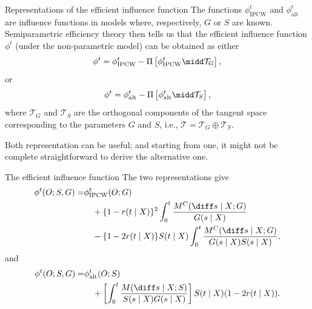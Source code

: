 \documentclass[handout]{beamer}\usepackage{listings}
\begin{document}
\begin{frame}[label={sec:org7dbfd63}]{Representations of the efficient influence function}
The functions $\phi^t_{\mathrm{IPCW}}$ and $\phi^t_{\mathrm{alt}}$ are influence functions in
models where, respectively, $G$ or $S$ are known. \pause Semiparametric efficiency theory then
tells us that the efficient influence function $\phi^t$ (under the non-parametric model) can be
obtained as either
\begin{equation*}
  \phi^t = 
  \phi^t_{\mathrm{IPCW}} - \Pi
  \left[
    \phi^t_{\mathrm{IPCW}} \midd \mathcal{T}_{G}
  \right],
\end{equation*}
or
\begin{equation*}
  \phi^t = 
  \phi^t_{\mathrm{alt}} - \Pi
  \left[
    \phi^t_{\mathrm{alt}} \midd \mathcal{T}_{S}
  \right],
\end{equation*}
where $\mathcal{T}_G$ and $\mathcal{T}_S$ are the orthogonal components of the tangent space
corresponding to the parameters $G$ and $S$, i.e., $\mathcal{T} = \mathcal{T}_G \oplus \mathcal{T}_S$.

\vfill \pause

Both representation can be useful; and starting from one, it might not be complete
straightforward to derive the alternative one.
\end{frame}

\begin{frame}[label={sec:org7cde526}]{The efficient influence function}
The two representations give
\begin{align*}
  \phi^t(O; S, G) =   & \phi^t_{\mathrm{IPCW}}(O; G)
  \\ & \quad +
       \{1-r(t \mid X)\}^2 \int_0^t \frac{M^C(\diff s \mid X; G)}{G(s \mid X)}
  \\ & \quad -
       \{1-2r(t \mid X)\} S(t \mid X) \int_0^t \frac{M^C(\diff s \mid X; G)}{G(s \mid X) S(s
       \mid X)},
\end{align*}
and
\begin{align*}
  \phi^t(O; S, G) = & \phi^t_{\mathrm{alt}}(O; S)
  \\ & \quad + \left[ %
    \int_0^t \frac{M(\diff s \mid X; S)}{S(s\mid X)G(s \mid X)} \right] S(t \mid X)
  (1 - 2r(t\mid X)).
\end{align*}
\end{frame}
\end{document}
